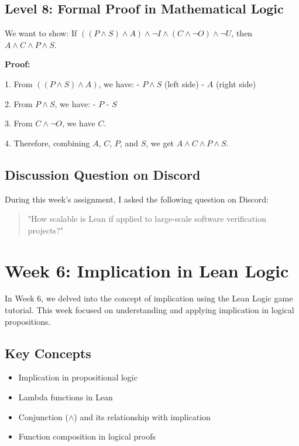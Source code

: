 \documentclass{article}
\begin{document}
\subsection*{Level 8: Formal Proof in Mathematical Logic}

We want to show: If \(((P \land S) \land A) \land \neg I \land (C \land \neg O) \land \neg U\), then \(A \land C \land P \land S\).

\textbf{Proof:}

1. From \(((P \land S) \land A)\), we have:
   - \(P \land S\) (left side)
   - \(A\) (right side)

2. From \(P \land S\), we have:
   - \(P\)
   - \(S\)

3. From \(C \land \neg O\), we have \(C\).

4. Therefore, combining \(A\), \(C\), \(P\), and \(S\), we get \(A \land C \land P \land S\).

\subsection*{Discussion Question on Discord}

During this week's assignment, I asked the following question on Discord:

\begin{quote}
\small
"How scalable is Lean if applied to large-scale software verification projects?"
\end{quote}

\section{Week 6: Implication in Lean Logic}
\label{sec:week6}

In Week 6, we delved into the concept of implication using the Lean Logic game tutorial. This week focused on understanding and applying implication in logical propositions.

\subsection*{Key Concepts}

\begin{itemize}
    \item Implication in propositional logic
    \item Lambda functions in Lean
    \item Conjunction (\(\land\)) and its relationship with implication
    \item Function composition in logical proofs
\end{itemize}
\end{document}
